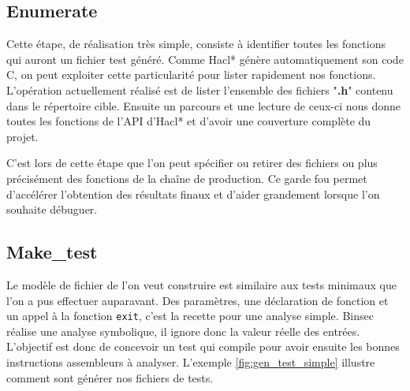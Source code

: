 \subsection*{Enumerate}

Cette étape, de réalisation très simple, consiste à identifier toutes les fonctions qui auront un fichier test généré. Comme Hacl* génère automatiquement son code C, on peut exploiter cette particularité pour lister rapidement nos fonctions. L'opération actuellement réalisé est de lister l'ensemble des fichiers "\textbf{.h}" contenu dans le répertoire cible. Ensuite un parcours et une lecture de ceux-ci nous donne toutes les fonctions de l'API d'Hacl* et d'avoir une couverture complète du projet.\smallbreak

C'est lors de cette étape que l'on peut spécifier ou retirer des fichiers ou plus précisément des fonctions de la chaîne de production. Ce garde fou permet d'accélérer l'obtention des résultats finaux et d'aider grandement lorsque l'on souhaite débuguer.

\subsection*{Make\_test}

Le modèle de fichier de l'on veut construire est similaire aux tests minimaux que l'on a pus effectuer auparavant. Des paramètres, une déclaration de fonction et un appel à la fonction \texttt{exit}, c'est la recette pour une analyse simple. Binsec réalise une analyse symbolique, il ignore donc la valeur réelle des entrées. L'objectif est donc de concevoir un test qui compile pour avoir ensuite les bonnes instructions assembleurs à analyser. L'exemple \ref{fig:gen_test_simple} illustre comment sont générer nos fichiers de tests.\medbreak

